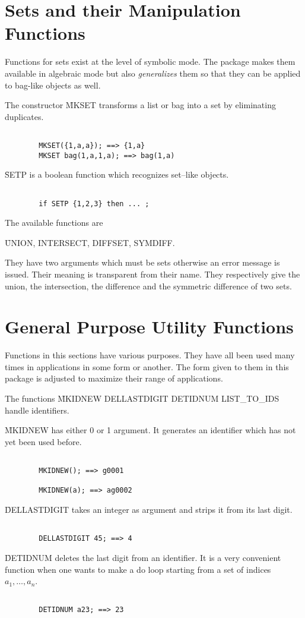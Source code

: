 \section{Sets and their Manipulation Functions}
Functions for sets exist at the level of symbolic mode. The
package makes them available in algebraic mode but also {\em generalizes}
them so that they can be applied to bag-like objects as well.
\bi
\item[i.]
The constructor \f{MKSET} transforms a list or bag into a set by eliminating
duplicates.
\begin{verbatim}

        MKSET({1,a,a}); ==> {1,a}
        MKSET bag(1,a,1,a); ==> bag(1,a)

\end{verbatim}

\f{SETP} is a boolean function which recognizes set--like objects.
\begin{verbatim}

        if SETP {1,2,3} then ... ;

\end{verbatim}
\item[ii.]
The available functions are
\begin{center}
\f{UNION, INTERSECT, DIFFSET, SYMDIFF}.
\end{center}
They have two arguments which must be sets otherwise an error message
is issued.
Their meaning is transparent from their name. They respectively give the
union, the intersection, the difference and the symmetric difference of two
sets.
\ei
\section{General Purpose Utility Functions}
Functions in this sections have various purposes. They have all been used
many times in applications in some form or another. The form given
to them in this package is adjusted to maximize their range of applications.
\bi
\item[i.]
The functions \f{MKIDNEW DELLASTDIGIT DETIDNUM LIST\_TO\_IDS}
handle identifiers. 

\f{MKIDNEW} has either 0 or 1 argument. 
It generates an identifier which has not yet been used before.
\begin{verbatim}

        MKIDNEW(); ==> g0001

        MKIDNEW(a); ==> ag0002

\end{verbatim}
\f{DELLASTDIGIT} takes an integer as argument and strips it from its last
digit.
\begin{verbatim}

        DELLASTDIGIT 45; ==> 4

\end{verbatim}
\f{DETIDNUM} deletes the last digit from an
identifier. It is a very convenient function when one wants to make a do
loop starting from a set of indices $ a_1, \ldots , a_{n} $.
\begin{verbatim}

        DETIDNUM a23; ==> 23

\end{verbatim}


